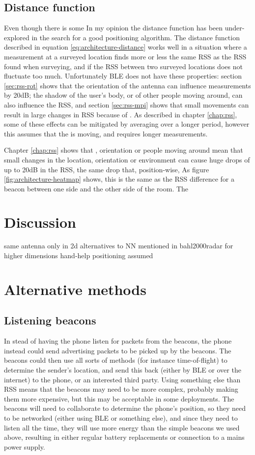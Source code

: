 \subsection{Distance function}
Even though there is some 
In my opinion the distance function has been under-explored in the search for a good positioning algorithm.
The distance function described in equation \ref{eq:architecture-distance} works well in a situation where a measurement at a surveyed location finds more or less the same RSS as the RSS found when surveying, and if the RSS between two surveyed locations does not fluctuate too much.
Unfortunately BLE does not have these properties: section \ref{sec:rss-rot} shows that the orientation of the antenna can influence measurements by 20dB; the shadow of the user's body, or of other people moving around, can also influence the RSS, and section \ref{sec:rss-mpi} shows that small movements can result in large changes in RSS because of \mpi.
As described in chapter \ref{chap:rss}, some of these effects can be mitigated by averaging over a longer period, however this assumes that the \device is moving, and requires longer measurements.


Chapter \ref{chap:rss} shows that \mpi, orientation or people moving around mean that small changes in the location, orientation or environment can cause huge drops of up to 20dB in the RSS, the same drop that, position-wise, 
As figure \ref{fig:architecture-heatmap} shows, this is the same as the RSS difference for a beacon between one side and the other side of the room.
The 



\section{Discussion}
\label{sec:architecture-discussion}
same antenna
only in 2d
alternatives to NN mentioned in bahl2000radar for higher dimensions
hand-help positioning assumed

\section{Alternative methods}
\label{sec:architecture-alternative}
\subsection{Listening beacons}
In stead of having the phone listen for packets from the beacons, the phone instead could send advertising packets to be picked up by the beacons.
The beacons could then use all sorts of methods (for instance time-of-flight) to determine the sender's location, and send this back (either by BLE or over the internet) to the phone, or an interested third party.
Using something else than RSS means that the beacons may need to be more complex, probably making them more expensive, but this may be acceptable in some deployments.
The beacons will need to collaborate to determine the phone's position, so they need to be networked (either using BLE or something else), and since they need to listen all the time, they will use more energy than the simple beacons we used above, resulting in either regular battery replacements or connection to a mains power supply.

